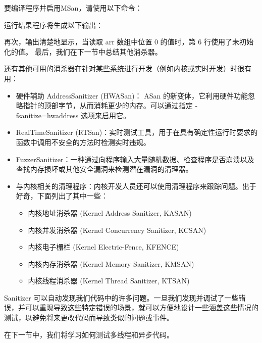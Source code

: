 要编译程序并启用MSan，请使用以下命令：


运行结果程序将生成以下输出：


再次，输出清楚地显示，当读取 arr 数组中位置 0 的值时，第 6 行使用了未初始化的值。
最后，我们在下一节中总结其他消杀器。


还有其他可用的消杀器在针对某些系统进行开发（例如内核或实时开发）时很有用：

\begin{itemize}
\item
硬件辅助 AddressSanitizer (HWASan)： ASan 的新变体，它利用硬件功能忽略指针的顶部字节，从而消耗更少的内存。可以通过指定 -fsanitize=hwaddress 选项来启用它。

\item
RealTimeSanitizer (RTSan)：实时测试工具，用于在具有确定性运行时要求的函数中调用不安全的方法时检测实时违规。

\item
FuzzerSanitizer：一种通过向程序输入大量随机数据、检查程序是否崩溃以及查找内存损坏或其他安全漏洞来检测潜在漏洞的清理器。

\item
与内核相关的清理程序：内核开发人员还可以使用清理程序来跟踪问题。出于好奇，下面列出了其中一些：

\begin{itemize}
\item
内核地址消杀器 (Kernel Address Sanitizer, KASAN)

\item
内核并发消杀器 (Kernel Concurrency Sanitizer, KCSAN)

\item
内核电子栅栏 (Kernel Electric-Fence, KFENCE)

\item
内核内存消杀器 (Kernel Memory Sanitizer, KMSAN)

\item
内核线程消杀器 (Kernel Thread Sanitizer, KTSAN)
\end{itemize}
\end{itemize}

Sanitizer 可以自动发现我们代码中的许多问题。一旦我们发现并调试了一些错误，并可以重现导致这些特定错误的场景，就可以方便地设计一些涵盖这些情况的测试，以避免将来更改代码而导致类似的问题或事件。

在下一节中，我们将学习如何测试多线程和异步代码。


